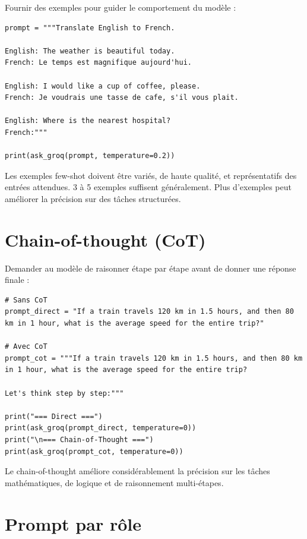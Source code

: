 Fournir des exemples pour guider le comportement du mod\`ele :

\begin{verbatim}
prompt = """Translate English to French.

English: The weather is beautiful today.
French: Le temps est magnifique aujourd'hui.

English: I would like a cup of coffee, please.
French: Je voudrais une tasse de cafe, s'il vous plait.

English: Where is the nearest hospital?
French:"""

print(ask_groq(prompt, temperature=0.2))
\end{verbatim}

\begin{aitip}
Les exemples few-shot doivent \^etre vari\'es, de haute qualit\'e, et repr\'esentatifs des entr\'ees attendues. 3 \`a 5 exemples suffisent g\'en\'eralement. Plus d'exemples peut am\'eliorer la pr\'ecision sur des t\^aches structur\'ees.
\end{aitip}

\section{Chain-of-thought (CoT)}

Demander au mod\`ele de raisonner \'etape par \'etape avant de donner une r\'eponse finale :

\begin{verbatim}
# Sans CoT
prompt_direct = "If a train travels 120 km in 1.5 hours, and then 80 km in 1 hour, what is the average speed for the entire trip?"

# Avec CoT
prompt_cot = """If a train travels 120 km in 1.5 hours, and then 80 km in 1 hour, what is the average speed for the entire trip?

Let's think step by step:"""

print("=== Direct ===")
print(ask_groq(prompt_direct, temperature=0))
print("\n=== Chain-of-Thought ===")
print(ask_groq(prompt_cot, temperature=0))
\end{verbatim}

Le chain-of-thought am\'eliore consid\'erablement la pr\'ecision sur les t\^aches math\'ematiques, de logique et de raisonnement multi-\'etapes.

\section{Prompt par r\^ole}

